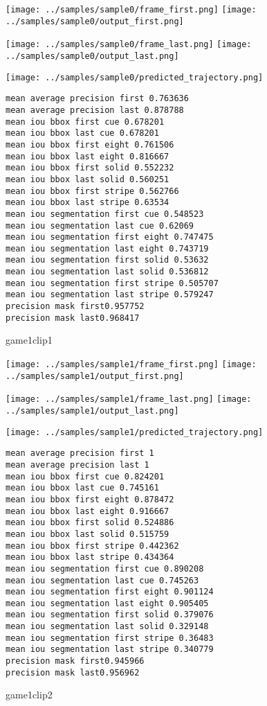 \begin{figure}
\texttt{[image: ../samples/sample0/frame\_first.png]}
\texttt{[image: ../samples/sample0/output\_first.png]}\par
\texttt{[image: ../samples/sample0/frame\_last.png]}
\texttt{[image: ../samples/sample0/output\_last.png]}\par
\texttt{[image: ../samples/sample0/predicted\_trajectory.png]}
\caption{game1clip1}
\begin{verbatim}
mean average precision first 0.763636
mean average precision last 0.878788
mean iou bbox first cue 0.678201
mean iou bbox last cue 0.678201
mean iou bbox first eight 0.761506
mean iou bbox last eight 0.816667
mean iou bbox first solid 0.552232
mean iou bbox last solid 0.560251
mean iou bbox first stripe 0.562766
mean iou bbox last stripe 0.63534
mean iou segmentation first cue 0.548523
mean iou segmentation last cue 0.62069
mean iou segmentation first eight 0.747475
mean iou segmentation last eight 0.743719
mean iou segmentation first solid 0.53632
mean iou segmentation last solid 0.536812
mean iou segmentation first stripe 0.505707
mean iou segmentation last stripe 0.579247
precision mask first0.957752
precision mask last0.968417
\end{verbatim}
\end{figure}

\begin{figure}
\texttt{[image: ../samples/sample1/frame\_first.png]}
\texttt{[image: ../samples/sample1/output\_first.png]}\par
\texttt{[image: ../samples/sample1/frame\_last.png]}
\texttt{[image: ../samples/sample1/output\_last.png]}\par
\texttt{[image: ../samples/sample1/predicted\_trajectory.png]}
\caption{game1clip2}
\begin{verbatim}
mean average precision first 1
mean average precision last 1
mean iou bbox first cue 0.824201
mean iou bbox last cue 0.745161
mean iou bbox first eight 0.878472
mean iou bbox last eight 0.916667
mean iou bbox first solid 0.524886
mean iou bbox last solid 0.515759
mean iou bbox first stripe 0.442362
mean iou bbox last stripe 0.434364
mean iou segmentation first cue 0.890208
mean iou segmentation last cue 0.745263
mean iou segmentation first eight 0.901124
mean iou segmentation last eight 0.905405
mean iou segmentation first solid 0.379076
mean iou segmentation last solid 0.329148
mean iou segmentation first stripe 0.36483
mean iou segmentation last stripe 0.340779
precision mask first0.945966
precision mask last0.956962
\end{verbatim}
\end{figure}

